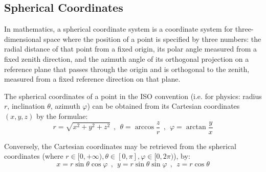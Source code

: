 \subsection{Spherical Coordinates}
In mathematics, a spherical coordinate system is a coordinate system for three-dimensional space where the position of a point is specified by three numbers: the radial distance of that point from a fixed origin, its polar angle measured from a fixed zenith direction, and the azimuth angle of its orthogonal projection on a reference plane that passes through the origin and is orthogonal to the zenith, measured from a fixed reference direction on that plane.

The spherical coordinates of a point in the ISO convention (i.e. for physics: radius $r$, inclination $\theta$, azimuth $\varphi$) can be obtained from its Cartesian coordinates $(x, y, z)$ by the formulae:
\[
r=\sqrt{x^2+y^2+z^2} ~~,~~ \theta=\arccos\frac{z}{r} ~~,~~ \varphi = \arctan\frac{y}{x}
\]

Conversely, the Cartesian coordinates may be retrieved from the spherical coordinates (where $r \in [0, +\infty), \theta \in [0, \pi], \varphi \in [0, 2\pi)$), by:
\[
x=r\sin\theta\cos\varphi ~~,~~ y=r\sin\theta\sin\varphi ~~,~~ z=r\cos\theta
\]
